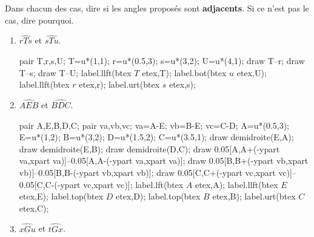 \begin{exercice*}
    Dans chacun des cas, dire si les angles proposés sont \textbf{adjacents}. Si ce n'est pas le cas, dire pourquoi.
    \begin{multicols}{2}
        \begin{enumerate}
            \item $\widehat{rTs}$ et $\widehat{sTu}$.\par
            \hspace*{-5mm}
            \begin{Geometrie}[CoinHD={(4u,4u)}]
                pair T,r,s,U;
                T=u*(1,1);
                r=u*(0.5,3);
                s=u*(3,2);
                U=u*(4,1);
                draw T--r;
                draw T--s;
                draw T--U;
                label.llft(btex $T$ etex,T);
                label.bot(btex $u$ etex,U);
                label.llft(btex $r$ etex,r);
                label.urt(btex $s$ etex,s);
            \end{Geometrie}
            \item $\widehat{AEB}$ et $\widehat{BDC}$.\par
            \hspace*{-5mm}
            \begin{Geometrie}[CoinHD={(4u,4u)}]
                pair A,E,B,D,C;
                pair va,vb,vc;
                va=A-E;
                vb=B-E;
                vc=C-D;
                A=u*(0.5,3);
                E=u*(1,2);
                B=u*(3,2);
                D=u*(1.5,2);
                C=u*(3.5,1);            
                draw demidroite(E,A);
                draw demidroite(E,B);
                draw demidroite(D,C);
                draw 0.05[A,A+(-ypart va,xpart va)]--0.05[A,A-(-ypart va,xpart va)];
                draw 0.05[B,B+(-ypart vb,xpart vb)]--0.05[B,B-(-ypart vb,xpart vb)];
                draw 0.05[C,C+(-ypart vc,xpart vc)]--0.05[C,C-(-ypart vc,xpart vc)];
                label.lft(btex $A$ etex,A);
                label.llft(btex $E$ etex,E);
                label.top(btex $D$ etex,D);
                label.top(btex $B$ etex,B);
                label.urt(btex $C$ etex,C);
            \end{Geometrie}
            \item $\widehat{xGu}$ et $\widehat{tGx}$.\par
            \hspace*{-5mm}
            \begin{Geometrie}[CoinHD={(4u,3.5u)}]

\end{Geometrie}
\end{enumerate}
\end{multicols}
\end{exercice*}
